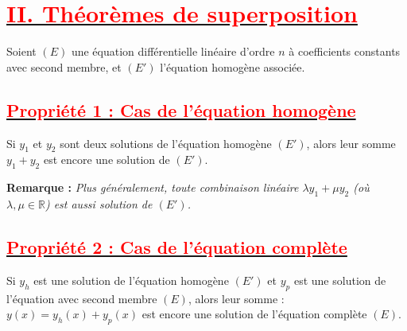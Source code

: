 \documentclass[12pt,a4paper]{article}
\newenvironment{remarque}{\smallskip\noindent\textbf{Remarque : }\itshape}{\smallskip}
\begin{document}
\section*{\underline{\textbf{\textcolor{red}{II. Théorèmes de superposition}}}}

Soient $(E)$ une équation différentielle linéaire d'ordre $n$ à coefficients constants avec second membre, et $(E')$ l'équation homogène associée.

\subsection*{\underline{\textbf{\textcolor{red}{Propriété 1 : Cas de l'équation homogène}}}}
Si $y_1$ et $y_2$ sont deux solutions de l'équation homogène $(E')$, alors leur somme $y_1 + y_2$ est encore une solution de $(E')$.

\begin{remarque}
Plus généralement, toute combinaison linéaire $\lambda y_1 + \mu y_2$ (où $\lambda, \mu \in \mathbb{R}$) est aussi solution de $(E')$.
\end{remarque}

\subsection*{\underline{\textbf{\textcolor{red}{Propriété 2 : Cas de l'équation complète}}}}
Si $y_h$ est une solution de l'équation homogène $(E')$ et $y_p$ est une solution de l'équation avec second membre $(E)$, alors leur somme :
$ y(x) = y_h(x) + y_p(x)$
est encore une solution de l'équation complète $(E)$.
\end{document}
